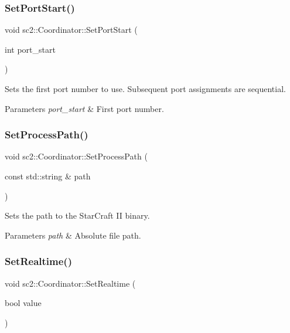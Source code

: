 \subsubsection{\texorpdfstring{Set\+Port\+Start()}{SetPortStart()}}
{\footnotesize\ttfamily void sc2\+::\+Coordinator\+::\+Set\+Port\+Start (\begin{DoxyParamCaption}\item[{int}]{port\+\_\+start }\end{DoxyParamCaption})}

Sets the first port number to use. Subsequent port assignments are sequential. 
\begin{DoxyParams}{Parameters}
{\em port\+\_\+start} & First port number. \\
\hline
\end{DoxyParams}
\mbox{\label{classsc2_1_1_coordinator_ad906656238e13a8bab21c46f50aecc3d}} 
\subsubsection{\texorpdfstring{Set\+Process\+Path()}{SetProcessPath()}}
{\footnotesize\ttfamily void sc2\+::\+Coordinator\+::\+Set\+Process\+Path (\begin{DoxyParamCaption}\item[{const std\+::string \&}]{path }\end{DoxyParamCaption})}

Sets the path to the Star\+Craft II binary. 
\begin{DoxyParams}{Parameters}
{\em path} & Absolute file path. \\
\hline
\end{DoxyParams}
\mbox{\label{classsc2_1_1_coordinator_a602e6ead93e360771ce36d6ac782fc2a}} 
\subsubsection{\texorpdfstring{Set\+Realtime()}{SetRealtime()}}
{\footnotesize\ttfamily void sc2\+::\+Coordinator\+::\+Set\+Realtime (\begin{DoxyParamCaption}\item[{bool}]{value }\end{DoxyParamCaption})}

